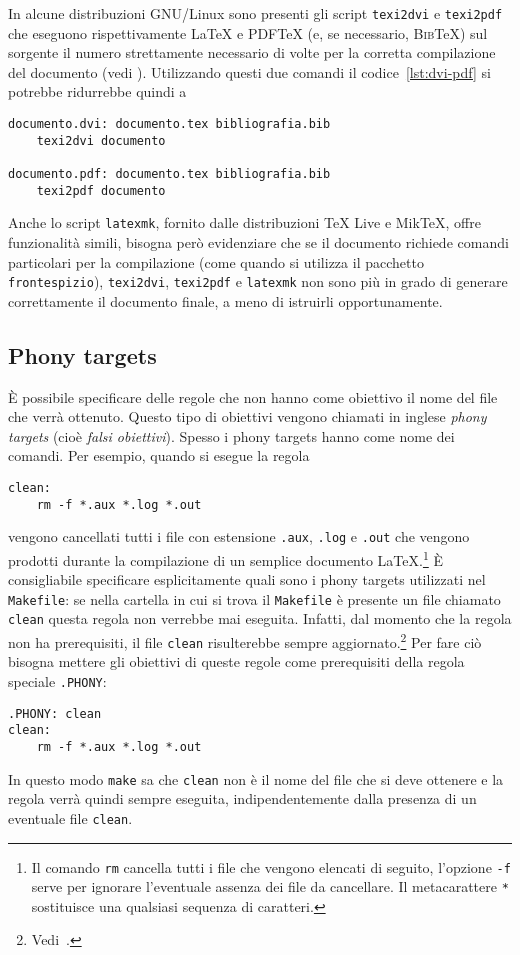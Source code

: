 In alcune distribuzioni GNU/Linux sono presenti gli script \texttt{texi2dvi} e
\texttt{texi2pdf} che eseguono rispettivamente \LaTeX{}
e \textsc{PDF}\TeX{}
(e, se necessario, \textsc{Bib}\TeX) sul sorgente il numero strettamente
necessario di volte per la corretta compilazione del documento (vedi
\textcite[63]{caucci:tabelle}).  Utilizzando questi due comandi il
codice~\ref{lst:dvi-pdf} si potrebbe ridurrebbe quindi a
\begin{lstlisting}
documento.dvi: documento.tex bibliografia.bib
	texi2dvi documento

documento.pdf: documento.tex bibliografia.bib
	texi2pdf documento
\end{lstlisting}
Anche lo script \texttt{latexmk}, fornito dalle distribuzioni TeX Live e MikTeX,
offre funzionalità simili, bisogna però evidenziare che se il documento richiede
comandi particolari per la compilazione (come quando si utilizza il pacchetto
\texttt{frontespizio}), \texttt{texi2dvi}, \texttt{texi2pdf} e \texttt{latexmk}
non sono più in grado di generare correttamente il documento finale, a meno di
istruirli opportunamente.

\subsection{Phony targets}
\label{sec:phony}

È possibile specificare delle regole che non hanno come obiettivo il nome del
file che verrà ottenuto.  Questo tipo di obiettivi vengono chiamati in inglese
\emph{phony targets} (cioè \emph{falsi obiettivi}).  Spesso i phony targets
hanno come nome dei comandi. Per esempio, quando si esegue la regola
\begin{lstlisting}
clean:
	rm -f *.aux *.log *.out
\end{lstlisting}
vengono cancellati tutti i file con estensione \texttt{.aux}, \texttt{.log} e
\texttt{.out} che vengono prodotti durante la compilazione di un semplice
documento
\LaTeX.\footnote{Il comando \texttt{rm} cancella tutti i file che vengono
  elencati di seguito, l'opzione \texttt{-f} serve per ignorare l'eventuale
  assenza dei file da cancellare.  Il metacarattere \texttt{*} sostituisce una
  qualsiasi sequenza di caratteri.}
È consigliabile specificare esplicitamente quali sono i phony targets utilizzati
nel \texttt{Makefile}: se nella cartella in cui si trova il \texttt{Makefile} è
presente un file chiamato \texttt{clean} questa regola non verrebbe mai
eseguita.  Infatti, dal momento che la regola non ha prerequisiti, il file
\texttt{clean} risulterebbe sempre
aggiornato.\footnote{Vedi~\textcite[31]{gnu:make}.}  Per fare ciò bisogna
mettere gli obiettivi di queste regole come prerequisiti della regola speciale
\texttt{.PHONY}:
\begin{lstlisting}
.PHONY: clean
clean:
	rm -f *.aux *.log *.out
\end{lstlisting}
In questo modo \texttt{make} sa che \texttt{clean} non è il nome del file che si
deve ottenere e la regola verrà quindi sempre eseguita, indipendentemente dalla
presenza di un eventuale file \texttt{clean}.

